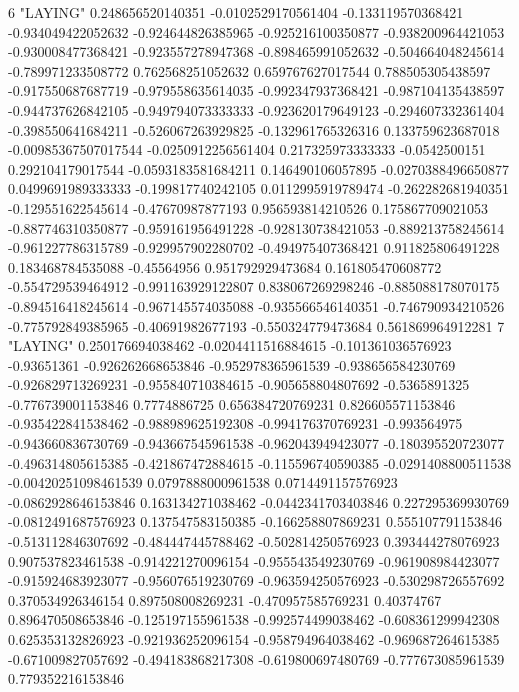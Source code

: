 6 "LAYING" 0.248656520140351 -0.0102529170561404 -0.133119570368421 -0.934049422052632 -0.924644826385965 -0.925216100350877 -0.938200964421053 -0.930008477368421 -0.923557278947368 -0.898465991052632 -0.504664048245614 -0.789971233508772 0.762568251052632 0.659767627017544 0.788505305438597 -0.917550687687719 -0.979558635614035 -0.992347937368421 -0.987104135438597 -0.944737626842105 -0.949794073333333 -0.923620179649123 -0.294607332361404 -0.398550641684211 -0.526067263929825 -0.132961765326316 0.133759623687018 -0.00985367507017544 -0.0250912256561404 0.217325973333333 -0.0542500151 0.292104179017544 -0.0593183581684211 0.146490106057895 -0.0270388496650877 0.0499691989333333 -0.199817740242105 0.0112995919789474 -0.262282681940351 -0.129551622545614 -0.47670987877193 0.956593814210526 0.175867709021053 -0.887746310350877 -0.959161956491228 -0.928130738421053 -0.889213758245614 -0.961227786315789 -0.929957902280702 -0.494975407368421 0.911825806491228 0.183468784535088 -0.45564956 0.951792929473684 0.161805470608772 -0.554729539464912 -0.991163929122807 0.838067269298246 -0.885088178070175 -0.894516418245614 -0.967145574035088 -0.935566546140351 -0.746790934210526 -0.775792849385965 -0.40691982677193 -0.550324779473684 0.561869964912281
7 "LAYING" 0.250176694038462 -0.0204411516884615 -0.101361036576923 -0.93651361 -0.926262668653846 -0.952978365961539 -0.938656584230769 -0.926829713269231 -0.955840710384615 -0.905658804807692 -0.5365891325 -0.776739001153846 0.7774886725 0.656384720769231 0.826605571153846 -0.935422841538462 -0.988989625192308 -0.994176370769231 -0.993564975 -0.943660836730769 -0.943667545961538 -0.962043949423077 -0.180395520723077 -0.496314805615385 -0.421867472884615 -0.115596740590385 -0.0291408800511538 -0.00420251098461539 0.0797888000961538 0.0714491157576923 -0.0862928646153846 0.163134271038462 -0.0442341703403846 0.227295369930769 -0.0812491687576923 0.137547583150385 -0.166258807869231 0.555107791153846 -0.513112846307692 -0.484447445788462 -0.502814250576923 0.393444278076923 0.907537823461538 -0.914221270096154 -0.955543549230769 -0.961908984423077 -0.915924683923077 -0.956076519230769 -0.963594250576923 -0.530298726557692 0.370534926346154 0.897508008269231 -0.470957585769231 0.40374767 0.896470508653846 -0.125197155961538 -0.992574499038462 -0.608361299942308 0.625353132826923 -0.921936252096154 -0.958794964038462 -0.969687264615385 -0.671009827057692 -0.494183868217308 -0.619800697480769 -0.777673085961539 0.779352216153846
